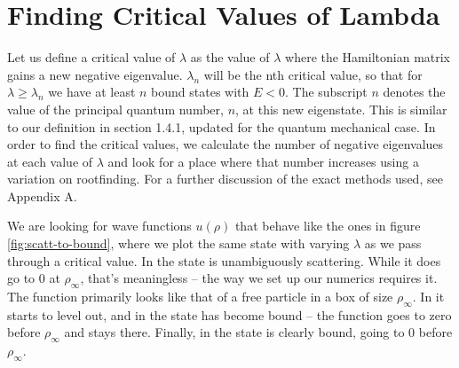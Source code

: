\documentclass[12pt,twoside]{reedthesis}
\begin{document}
\section{Finding Critical Values of Lambda}
Let us define a critical value of $\lambda$ as the value of $\lambda$ where the Hamiltonian matrix gains a new negative eigenvalue. $\lambda_n$ will be the nth critical value, so that for $\lambda \geq \lambda_n$ we have at least $n$ bound states with $E < 0$. The subscript $n$ denotes the value of the principal quantum number, $n$, at this new eigenstate. This is similar to our definition in section 1.4.1, updated for the quantum mechanical case.
In order to find the critical values, we calculate the number of negative eigenvalues at each value of $\lambda$ and look for a place where that number increases using a variation on rootfinding. For a further discussion of the exact methods used, see Appendix A.

We are looking for wave functions $u(\rho)$ that behave like the ones in figure \ref{fig:scatt-to-bound}, where we plot the same state with varying $\lambda$ as we pass through a critical value. In  the state is unambiguously scattering. While it does go to 0 at $\rho_{\infty}$, that's meaningless -- the way we set up our numerics requires it.
The function primarily looks like that of a free particle in a box of size $\rho_{\infty}$. 
 In  it starts to level out, and in  the state has become bound -- the function goes to zero before $\rho_{\infty}$ and stays there. Finally, in  the state is clearly bound, going to 0 before $\rho_{\infty}$. 
\end{document}
